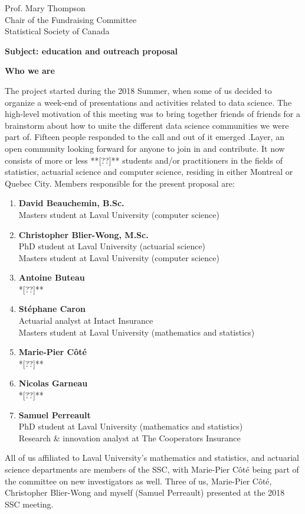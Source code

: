 \documentclass[11pt, a4paper]{letter} %
\begin{document}
\begin{letter}{
	Prof. Mary Thompson\\
	Chair of the Fundraising Committee\\
	Statistical Society of Canada
	
	\bigskip
	\textbf{Subject: education and outreach proposal}%
}
\bigskip
\noindent \textbf{Who we are}

The project started during the 2018 Summer, when some of us decided to organize a week-end of presentations and activities related to data science. The high-level motivation of this meeting was to bring together friends of friends for a brainstorm about how to unite the different data science communities we were part of. Fifteen people responded to the call and out of it emerged .Layer, an open community looking forward for anyone to join in and contribute. It now consists of more or less **[??]** students and/or practitioners in the fields of statistics, actuarial science and computer science, residing in either Montreal or Quebec City. Members responsible for the present proposal are:
\begin{enumerate}
	\item[] \textbf{David Beauchemin, B.Sc.}\\
	\quad Masters student at Laval University (computer science)
	\item[] \textbf{Christopher Blier-Wong, M.Sc.}\\
	\quad PhD student at Laval University (actuarial science)\\
	\quad Masters student at Laval University (computer science)
	\item[] \textbf{Antoine Buteau}\\
	\quad **[??]**
	\item[] \textbf{Stéphane Caron}\\
	\quad Actuarial analyst at Intact Insurance\\
	\quad Masters student at Laval University (mathematics and statistics)
	\item[] \textbf{Marie-Pier Côté}\\
	\quad **[??]**
	\item[] \textbf{Nicolas Garneau}\\
	\quad **[??]**
	\item[] \textbf{Samuel Perreault}\\
	\quad PhD student at Laval University (mathematics and statistics)\\
	\quad Research \& innovation analyst at The Cooperators Insurance
\end{enumerate}

\noindent All of us affiliated to Laval University's mathematics and statistics, and actuarial science departments are members of the SSC, with Marie-Pier Côté being part of the committee on new investigators as well. Three of us, Marie-Pier Côté, Christopher Blier-Wong and myself (Samuel Perreault) presented at the 2018 SSC meeting.



\end{letter}
\end{document}
